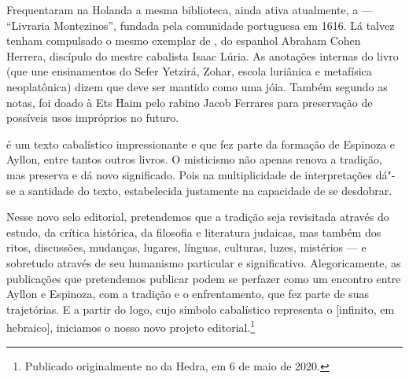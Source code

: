 \begin{multicols}{2}
Frequentaram na Holanda a mesma biblioteca, ainda ativa atualmente, a {} --- ``Livraria Montezinos'', fundada pela comunidade portuguesa em 1616. Lá talvez tenham compulsado o mesmo exemplar de {}, do espanhol Abraham Cohen Herrera, discípulo do mestre cabalista Isaac Lúria. As anotações internas do livro (que une ensinamentos do Sefer Yetzirá, Zohar, escola luriânica e metafísica neoplatônica) dizem que deve ser mantido como uma jóia. Também segundo as notas, foi doado à Ets Haim pelo rabino Jacob Ferrares para preservação de possíveis usos impróprios no futuro. 

{} é um texto cabalístico impressionante e que fez parte da formação de Espinoza e Ayllon, entre tantos outros livros. O misticismo não apenas renova a tradição, mas preserva e dá novo significado. Pois na multiplicidade de interpretações dá"-se a santidade do texto, estabelecida justamente na capacidade de se desdobrar.

Nesse novo selo editorial, pretendemos que a tradição seja revisitada através do estudo, da crítica histórica, da filosofia e literatura judaicas, mas também dos ritos, discussões, mudanças, lugares, línguas, culturas, luzes, mistérios --- e sobretudo através de seu humanismo particular e significativo. Alegoricamente, as publicações que pretendemos publicar podem se perfazer como um encontro entre Ayllon e Espinoza, com a tradição e o enfrentamento, que fez parte de suas trajetórias. E a partir do logo, cujo símbolo cabalístico representa o {} [infinito, em hebraico], iniciamos o nosso novo projeto editorial.\footnote[1]{Publicado originalmente no {} da Hedra, em 6 de maio de 2020.}
\end{multicols}

\pagebreak
